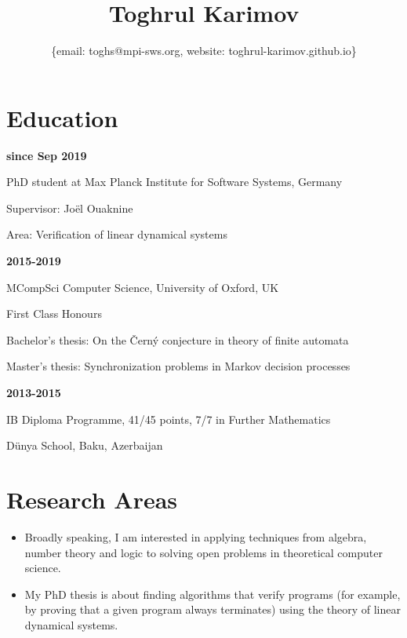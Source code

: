 \documentclass{article}
\title{\bfseries\Huge Toghrul Karimov}
\author{\{email: toghs@mpi-sws.org, website: toghrul-karimov.github.io\}}
\date{}
\begin{document}
	\maketitle
	\section*{Education}
		\begin{minipage}{0.3\textwidth}
			\hspace{0.5cm} \textbf{since Sep 2019}
		\end{minipage}
		\begin{minipage}{0.7\textwidth}
			PhD student at Max Planck Institute for Software Systems, Germany
			
			Supervisor: Jo\"el Ouaknine 
			
			Area: Verification of linear dynamical systems
		\end{minipage}
	
	\vspace{0.26cm}
	
	\noindent\begin{minipage}{0.3\textwidth}
		\hspace{0.5cm} \textbf{2015-2019}
	\end{minipage}
	\begin{minipage}{0.7\textwidth}
		MCompSci Computer Science, University of Oxford, UK
		
		First Class Honours
		
		Bachelor's thesis: On the Černý conjecture in theory of finite automata
		
		Master's thesis: Synchronization problems in Markov decision processes 
	\end{minipage}

	\vspace{0.27cm}
	
	\noindent\begin{minipage}{0.3\textwidth}
		\hspace{0.5cm} \textbf{2013-2015}
	\end{minipage}
	\begin{minipage}{0.7\textwidth}
		IB Diploma Programme, 41/45 points, 7/7 in Further Mathematics
		
		D\"unya School, Baku, Azerbaijan
	\end{minipage}

	\section*{Research Areas}
	\begin{itemize}
		\item Broadly speaking, I am interested in applying techniques from algebra, number theory and logic to solving open problems in theoretical computer science. 
		\item My PhD thesis is about finding algorithms that verify programs (for example, by proving that a given program always terminates) using the theory of linear dynamical systems.
	\end{itemize}
\end{document}
